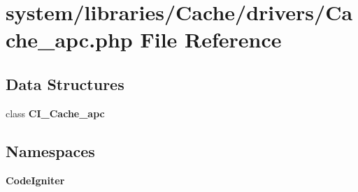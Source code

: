 \section{system/libraries/\-Cache/drivers/\-Cache\-\_\-apc.php File Reference}
\label{_cache__apc_8php}
\subsection*{Data Structures}
\begin{DoxyCompactItemize}
\item 
class {\bf C\-I\-\_\-\-Cache\-\_\-apc}
\end{DoxyCompactItemize}
\subsection*{Namespaces}
\begin{DoxyCompactItemize}
\item 
{\bf Code\-Igniter}
\end{DoxyCompactItemize}
